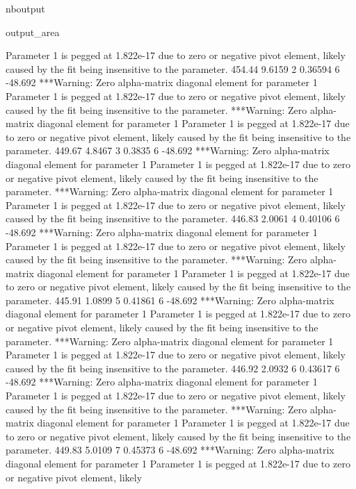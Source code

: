 \documentclass[letterpaper,10pt,english]{sphinxmanual}
\begin{document}
\begin{sphinxuseclass}{nboutput}
{\begin{sphinxuseclass}{output_area}
\begin{sphinxuseclass}{}
\begin{sphinxVerbatim}[commandchars=\\\{\}]
 Parameter 1 is pegged at 1.822e-17 due to zero or negative pivot element, likely
 caused by the fit being insensitive to the parameter.
          454.44      9.6159    2     0.36594    6     -48.692
***Warning: Zero alpha-matrix diagonal element for parameter 1
 Parameter 1 is pegged at 1.822e-17 due to zero or negative pivot element, likely
 caused by the fit being insensitive to the parameter.
***Warning: Zero alpha-matrix diagonal element for parameter 1
 Parameter 1 is pegged at 1.822e-17 due to zero or negative pivot element, likely
 caused by the fit being insensitive to the parameter.
          449.67      4.8467    3      0.3835    6     -48.692
***Warning: Zero alpha-matrix diagonal element for parameter 1
 Parameter 1 is pegged at 1.822e-17 due to zero or negative pivot element, likely
 caused by the fit being insensitive to the parameter.
***Warning: Zero alpha-matrix diagonal element for parameter 1
 Parameter 1 is pegged at 1.822e-17 due to zero or negative pivot element, likely
 caused by the fit being insensitive to the parameter.
          446.83      2.0061    4     0.40106    6     -48.692
***Warning: Zero alpha-matrix diagonal element for parameter 1
 Parameter 1 is pegged at 1.822e-17 due to zero or negative pivot element, likely
 caused by the fit being insensitive to the parameter.
***Warning: Zero alpha-matrix diagonal element for parameter 1
 Parameter 1 is pegged at 1.822e-17 due to zero or negative pivot element, likely
 caused by the fit being insensitive to the parameter.
          445.91      1.0899    5     0.41861    6     -48.692
***Warning: Zero alpha-matrix diagonal element for parameter 1
 Parameter 1 is pegged at 1.822e-17 due to zero or negative pivot element, likely
 caused by the fit being insensitive to the parameter.
***Warning: Zero alpha-matrix diagonal element for parameter 1
 Parameter 1 is pegged at 1.822e-17 due to zero or negative pivot element, likely
 caused by the fit being insensitive to the parameter.
          446.92      2.0932    6     0.43617    6     -48.692
***Warning: Zero alpha-matrix diagonal element for parameter 1
 Parameter 1 is pegged at 1.822e-17 due to zero or negative pivot element, likely
 caused by the fit being insensitive to the parameter.
***Warning: Zero alpha-matrix diagonal element for parameter 1
 Parameter 1 is pegged at 1.822e-17 due to zero or negative pivot element, likely
 caused by the fit being insensitive to the parameter.
          449.83      5.0109    7     0.45373    6     -48.692
***Warning: Zero alpha-matrix diagonal element for parameter 1
 Parameter 1 is pegged at 1.822e-17 due to zero or negative pivot element, likely

\end{sphinxVerbatim}
\end{sphinxuseclass}
\end{sphinxuseclass}}
\end{sphinxuseclass}
\end{document}
